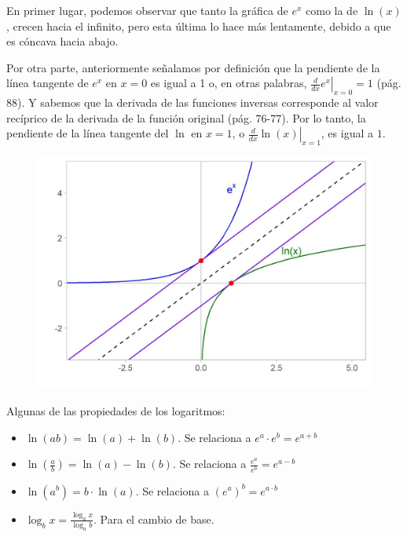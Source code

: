 \documentclass[12pt]{article}
\begin{document}
En primer lugar, podemos observar que tanto la gráfica de $e^{x}$ como la de $\ln(x)$, crecen hacia el infinito, pero esta última lo hace más lentamente, debido a que es cóncava hacia abajo.

Por otra parte, anteriormente señalamos por definición que la pendiente de la línea tangente de $e^{x}$ en $x = 0$ es igual a 1 o, en otras palabras, $\left. \frac{d}{dx} e^{x} \right|_{x = 0} = 1$ (pág. 88). Y sabemos que la derivada de las funciones inversas corresponde al valor recíprico de la derivada de la función original (pág. 76-77). Por lo tanto, la pendiente de la línea tangente del $\ln$ en $x = 1$, o $\left. \frac{d}{dx} \ln(x) \right|_{x = 1}$, es igual a $1$.

\newpage

\begin{figure}[hbt!]
\centering
\includegraphics[scale=0.7]{img/ln_e_plots_2.jpg}
\end{figure}

Algunas de las propiedades de los logaritmos:

\begin{itemize}
\item $\ln(ab) = \ln (a) + \ln (b)$. Se relaciona a $e^{a} \cdot e^{b} = e^{a + b}$
\item $\ln \left(\frac{a}{b}\right) = \ln (a) - \ln (b)$. Se relaciona a $\frac{e^{a}}{e^{b}} = e^{a - b}$
\item $\ln(a^{b}) = b \cdot \ln (a)$. Se relaciona a $(e^{a})^{b} = e^{a \cdot b}$
\item $\log_{b} x = \frac{\log_{a}x}{\log_{a} b}$. Para el cambio de base.
\end{itemize}
\end{document}
